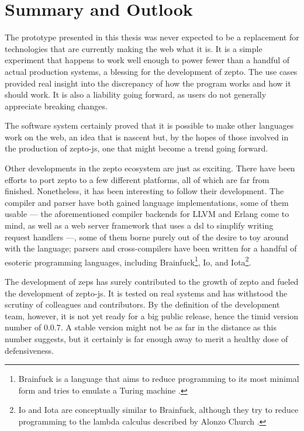 \documentclass[oneside,11pt,xetex]{scrbook}
\begin{document}
\chapter{Summary and Outlook}
\label{chap:outlook}

The prototype presented in this thesis was never expected to be a replacement
for technologies that are currently making the web what it is. It is a simple
experiment that happens to work well enough to power fewer than a handful of
actual production systems, a blessing for the development of zepto. The
use cases provided real insight into the discrepancy of how the program
works and how it should work. It is also a liability going forward, as users
do not generally appreciate breaking changes.

The software system certainly proved that it is possible to make other
languages work on the web, an idea that is nascent but, by the hopes of
those involved in the production of zepto-js, one that might become a trend
going forward.

Other developments in the zepto ecosystem are just as exciting. There have
been efforts to port zepto to a few different platforms, all of which are
far from finished. Nonetheless, it has been interesting to follow their development.
The compiler and parser have both gained language implementations, some of
them usable --- the aforementioned compiler backends for LLVM and Erlang come to
mind, as well as a web server framework that uses a \gls{dsl} to simplify writing
request handlers ---, some of them borne purely out of the desire to toy around
with the language; parsers and cross-compilers have been written for a handful of
esoteric programming languages, including Brainfuck\footnote{Brainfuck is a language
that aims to reduce programming to its most minimal form and tries to emulate a Turing
machine \parencite{BFK}.}, Io, and Iota\footnote{Io and Iota are conceptually similar
to Brainfuck, although they try to reduce programming to the lambda calculus described
by Alonzo Church \parencite{IOT}.}.

The development of \gls{zeps} has surely contributed to the growth of zepto and
fueled the development of zepto-js. It is tested on real systems and has
withstood the scrutiny of colleagues and contributors. By the definition of the
development team, however, it is not yet ready for a big public release, hence
the timid version number of 0.0.7. A stable version might not be as far in the
distance as this number suggests, but it certainly is far enough away to merit
a healthy dose of defensiveness.
\end{document}
